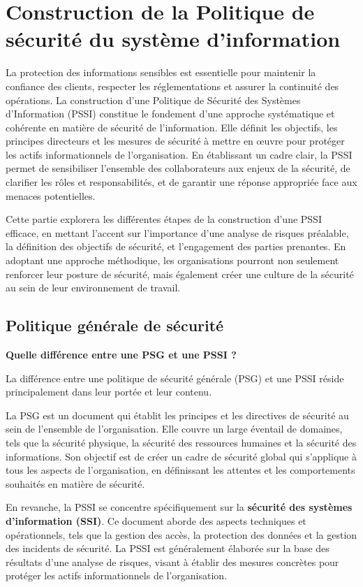 \section{Construction de la Politique de sécurité du système d'information}

La protection des informations sensibles est essentielle pour maintenir la confiance des clients, respecter les réglementations et assurer la continuité des opérations. La construction d'une Politique de Sécurité des Systèmes d'Information (PSSI) constitue le fondement d'une approche systématique et cohérente en matière de sécurité de l'information. Elle définit les objectifs, les principes directeurs et les mesures de sécurité à mettre en œuvre pour protéger les actifs informationnels de l'organisation. En établissant un cadre clair, la PSSI permet de sensibiliser l'ensemble des collaborateurs aux enjeux de la sécurité, de clarifier les rôles et responsabilités, et de garantir une réponse appropriée face aux menaces potentielles.

Cette partie explorera les différentes étapes de la construction d'une PSSI efficace, en mettant l'accent sur l'importance d'une analyse de risques préalable, la définition des objectifs de sécurité, et l'engagement des parties prenantes. En adoptant une approche méthodique, les organisations pourront non seulement renforcer leur posture de sécurité, mais également créer une culture de la sécurité au sein de leur environnement de travail.

\subsection{Politique générale de sécurité}
\textbf{Quelle différence entre une PSG et une PSSI ?}

La différence entre une politique de sécurité générale (PSG) et une PSSI réside principalement dans leur portée et leur contenu.

La PSG est un document qui établit les principes et les directives de sécurité au sein de l'ensemble de l'organisation. Elle couvre un large éventail de domaines, tels que la sécurité physique, la sécurité des ressources humaines et la sécurité des informations. Son objectif est de créer un cadre de sécurité global qui s'applique à tous les aspects de l'organisation, en définissant les attentes et les comportements souhaités en matière de sécurité.

En revanche, la PSSI se concentre spécifiquement sur la \textbf{sécurité des systèmes d'information (SSI)}. Ce document aborde des aspects techniques et opérationnels, tels que la gestion des accès, la protection des données et la gestion des incidents de sécurité. La PSSI est généralement élaborée sur la base des résultats d'une analyse de risques, visant à établir des mesures concrètes pour protéger les actifs informationnels de l'organisation.

